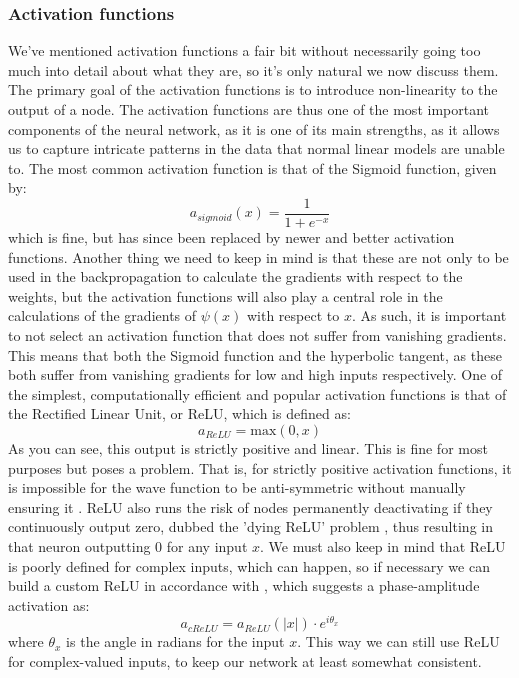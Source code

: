 \documentclass[12pt]{article}
\begin{document}
{\subsubsection{Activation functions}
We've mentioned activation functions a fair bit without necessarily going too much into detail about what they are, so it's only natural we now discuss them. The primary goal of the activation functions is to introduce non-linearity to the output of a node. The activation functions are thus one of the most important components of the neural network, as it is one of its main strengths, as it allows us to capture intricate patterns in the data that normal linear models are unable to. \newline
The most common activation function is that of the Sigmoid function, given by:
\begin{equation*}
    a_{sigmoid}(x) = \frac{1}{1 + e^{-x}} 
\end{equation*}
which is fine, but has since been replaced by newer and better activation functions. Another thing we need to keep in mind is that these are not only to be used in the backpropagation to calculate the gradients with respect to the weights, but the activation functions will also play a central role in the calculations of the gradients of $\psi(x)$ with respect to $x$. As such, it is important to not select an activation function that does not suffer from vanishing gradients. This means that both the Sigmoid function and the hyperbolic tangent, as these both suffer from vanishing gradients for low and high inputs respectively. \newline 
One of the simplest, computationally efficient and popular activation functions is that of the Rectified Linear Unit, or ReLU, which is defined as:
\begin{equation*}
    a_{ReLU} = \text{max}(0, x)
\end{equation*}
As you can see, this output is strictly positive and linear. This is fine for most purposes but poses a problem. That is, for strictly positive activation functions, it is impossible for the wave function to be anti-symmetric without manually ensuring it \cite{symm}. ReLU also runs the risk of nodes permanently deactivating if they continuously output zero, dubbed the 'dying ReLU' problem \cite{dying}, thus resulting in that neuron outputting $0$ for any input $x$. We must also keep in mind that ReLU is poorly defined for complex inputs, which can happen, so if necessary we can build a custom ReLU in accordance with \cite{cnn}, which suggests a phase-amplitude activation as:
\begin{equation*}
    a_{cReLU} = a_{ReLU}(|x|) \cdot e^{i \theta_x}
\end{equation*}
where $\theta_x$ is the angle in radians for the input $x$. This way we can still use ReLU for complex-valued inputs, to keep our network at least somewhat consistent.
\newline
}
\end{document}
